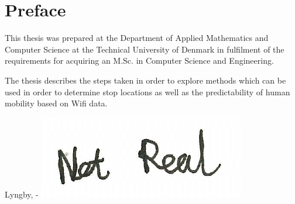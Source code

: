 \chapter{Preface}

This thesis was prepared at the Department of Applied Mathematics and Computer
Science at the Technical University of Denmark in fulfilment of the requirements
for acquiring an M.Sc. in Computer Science and Engineering.

The thesis describes the steps taken in order to explore methods which can be
used in order to determine stop locations as well as the predictability of human
mobility based on Wifi data.

\vspace{20mm}
\begin{center}
    \hspace{20mm} Lyngby, \thesishandin-\thesisyear
    \vspace{5mm}
    \newline
    \includegraphics[scale=0.5]{figures/SignatureDummy.jpg}
\end{center}
\begin{flushright}
    \thesisauthor
\end{flushright}
